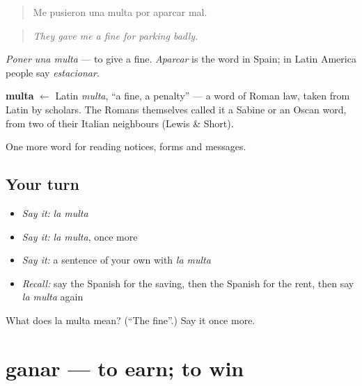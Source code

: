 \begin{quote}
Me pusieron una multa por aparcar mal.
\end{quote}

\begin{quote}
\emph{They gave me a fine for parking badly.}
\end{quote}

\emph{Poner una multa} — to give a fine. \emph{Aparcar} is the word in Spain; in Latin America people say \emph{estacionar}.

\begin{cousinweb}
\textbf{multa} $\leftarrow$ Latin \emph{multa}, \textquotedblleft{}a fine, a penalty\textquotedblright{} — a word of Roman law, taken from Latin by scholars. The Romans themselves called it a Sabine or an Oscan word, from two of their Italian neighbours (Lewis \& Short).
\end{cousinweb}

\begin{grammarlens}[title={What you've built}]
One more word for reading notices, forms and messages.
\end{grammarlens}

\subsection*{Your turn}
\begin{itemize}
\raggedright
  \item \emph{Say it:} \emph{la multa}
  \item \emph{Say it:} \emph{la multa}, once more
  \item \emph{Say it:} a sentence of your own with \emph{la multa}
  \item \emph{Recall:} say the Spanish for the saving, then the Spanish for the rent, then say \emph{la multa} again
\end{itemize}

\begin{tcolorbox}[breakable,colback=teal!4,colframe=teal!35!black,title={Before you move on}]
What does la multa mean? (\textquotedblleft{}The fine\textquotedblright{}.) Say it once more.
\end{tcolorbox}
\section[ganar]{ganar — to earn; to win}

\label{lesson:ES-C477-ganar}



